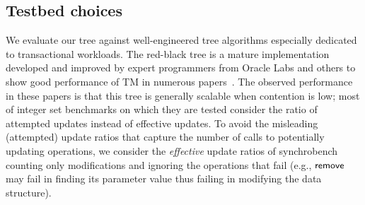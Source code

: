 \subsection{Testbed choices}
% 

We evaluate our tree against well-engineered 
tree algorithms especially dedicated to transactional workloads.
%
The red-black tree is a mature implementation developed and improved by expert programmers from Oracle Labs and 
others to show good performance of TM in numerous papers~\cite{DSS06,HLMS03,CCKO08,HK08,FFR08,YNW+08,DFGG11}.
The observed performance in these papers is that this tree is generally scalable when contention is low; most of integer set benchmarks on which they are tested 
consider the ratio of attempted updates instead of effective updates. 
To avoid the misleading (attempted) update ratios that capture the number of calls to potentially updating operations, we consider the \emph{effective} update ratios of synchrobench 
counting only modifications and ignoring the operations that fail (e.g., $\act{remove}$ may fail in finding its parameter value thus failing in modifying the data structure).

